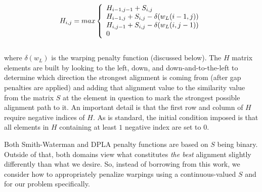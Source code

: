 \documentclass[a4paper,12pt]{report} 	%
\numberwithin{figure}{chapter}
\numberwithin{table}{chapter}
\numberwithin{equation}{chapter}
\begin{document}
\begin{flushleft}
\begin{equation}
H_{i,j} = max\left\{ 
  \begin{array}{l l}
    H_{i-1,j-1}+S_{i,j}\\
    H_{i-1,j}+S_{i,j}-\delta(w_L(i-1,j))\\
    H_{i,j-1}+S_{i,j}-\delta(w_L(i,j-1))\\
    0
   \end{array} \right.
\end{equation}
\\
\vspace{10 mm}
\noindent  where $\delta(w_L)$ is the warping penalty function (discussed below). The $H$ matrix elements are built by looking to the left, down, and down-and-to-the-left to determine which direction the strongest alignment is coming from (after gap penalties are applied) and adding that alignment value to the similarity value from the matrix $S$ at the element in question to mark the strongest possible alignment path to it. An important detail is that the first row and column of $H$ require negative indices of $H$. As is standard, the initial condition imposed is that all elements in $H$ containing at least $1$ negative index are set to $0$.

Both Smith-Waterman and DPLA penalty functions are based on $S$ being binary. Outside of that, both domains view what constitutes \emph{the best} alignment slightly differently than what we desire. So, instead of borrowing from this work, we consider how to appropriately penalize warpings using a continuous-valued $S$ and for our problem specifically.


\end{flushleft}
\end{document}
